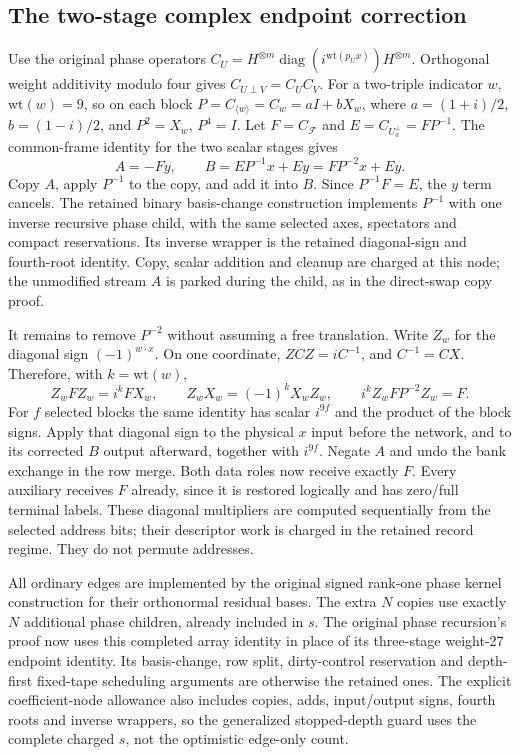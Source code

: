 \subsection{The two-stage complex endpoint correction}
\label{sec:two-stage-phase-transfer}
Use the original phase operators $C_U=H^{\otimes m}\operatorname{diag}
(i^{\mathrm{wt}(p_U x)})H^{\otimes m}$. Orthogonal weight additivity
modulo four gives $C_{U\perp V}=C_UC_V$. For a two-triple indicator
$w$, $\mathrm{wt}(w)=9$, so on each block
$P=C_{\langle w\rangle}=C_w=aI+bX_w$, where
$a=(1+i)/2$, $b=(1-i)/2$, and $P^2=X_w$, $P^4=I$.
Let $F=C_{\mathcal F}$ and $E=C_{U_a^\perp}=FP^{-1}$.
The common-frame identity for the two scalar stages gives
\[
 A=-Fy,\qquad B=EP^{-1}x+Ey=FP^{-2}x+Ey.
\]
Copy $A$, apply $P^{-1}$ to the copy, and add it into $B$. Since
$P^{-1}F=E$, the $y$ term cancels. The retained binary basis-change
construction implements $P^{-1}$ with one inverse recursive phase child,
with the same selected axes, spectators and compact reservations. Its
inverse wrapper is the retained diagonal-sign and fourth-root identity.
Copy, scalar addition and cleanup are charged at this node; the unmodified
stream $A$ is parked during the child, as in the direct-swap copy proof.

It remains to remove $P^{-2}$ without assuming a free translation. Write
$Z_w$ for the diagonal sign $(-1)^{w\cdot x}$. On one coordinate,
$ZCZ=iC^{-1}$, and $C^{-1}=CX$. Therefore, with $k=\mathrm{wt}(w)$,
\[
 Z_wFZ_w=i^kFX_w,\qquad
 Z_wX_w=(-1)^kX_wZ_w,\qquad
 i^k Z_wFP^{-2}Z_w=F.
\]
For $f$ selected blocks the same identity has scalar $i^{9f}$ and the
product of the block signs. Apply that diagonal sign to the physical $x$
input before the network, and to its corrected $B$ output afterward,
together with $i^{9f}$. Negate $A$ and undo the bank exchange in the row
merge. Both data roles now receive exactly $F$. Every auxiliary receives
$F$ already, since it is restored logically and has zero/full terminal
labels. These diagonal multipliers are computed sequentially from the
selected address bits; their descriptor work is charged in the retained
record regime. They do not permute addresses.

All ordinary edges are implemented by the original signed rank-one phase
kernel construction for their orthonormal residual bases. The extra $N$
copies use exactly $N$ additional phase children, already included in $s$.
The original phase recursion's proof now uses this completed array identity
in place of its three-stage weight-27 endpoint identity. Its basis-change,
row split, dirty-control reservation and depth-first fixed-tape scheduling
arguments are otherwise the retained ones. The explicit coefficient-node
allowance also includes copies, adds, input/output signs, fourth roots and
inverse wrappers, so the generalized stopped-depth guard uses the complete
charged $s$, not the optimistic edge-only count.
